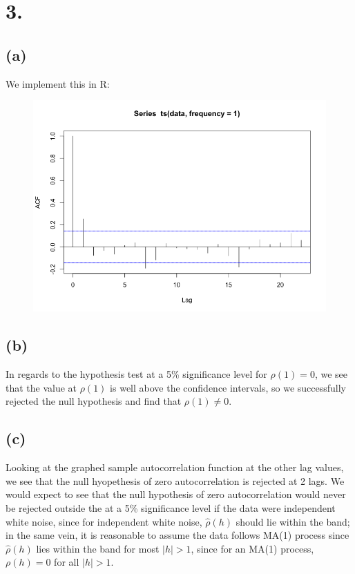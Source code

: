 \documentclass{article}
\begin{document}
\section*{3.}
{\Large 

\subsection*{(a)}

We implement this in R: \\ 
\begin{figure}[h!]
  \centering
  \includegraphics[width=500pt]{hw8_3a.png}
\end{figure}

\subsection*{(b)}

In regards to the hypothesis test at a 5\% significance level for $\rho(1) = 0$, we see that the value at $\rho(1)$ is well above the confidence intervals, so we successfully rejected the null hypothesis and find that $\rho(1) \neq 0$.

\subsection*{(c)}

Looking at the graphed sample autocorrelation function at the other lag values, we see that the null hyopethesis of zero autocorrelation is rejected at 2 lags. We would expect to see that the null hypothesis of zero autocorrelation would never be rejected outside the at a 5\% significance level if the data were independent white noise, since for independent white noise, $\hat{\rho}(h)$ should lie within the band; in the same vein, it is reasonable to assume the data follows MA(1) process since $\hat{\rho}(h)$ lies within the band for most $|h| > 1$, since for an MA(1) process, $\rho(h) = 0$ for all $|h| > 1$.

}
\end{document}
